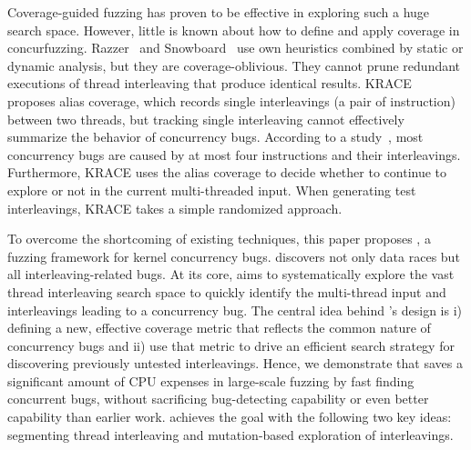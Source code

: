 

Coverage-guided fuzzing has proven to be effective in exploring such a huge search space.
However, little is known about how to define and apply coverage in concurfuzzing.
Razzer~\cite{razzer} and Snowboard~\cite{snowboard} use own heuristics
combined by static or dynamic analysis, but they are coverage-oblivious.
They cannot prune redundant executions of thread interleaving
that produce identical results. 
KRACE~\cite{krace} proposes alias coverage, which records 
single interleavings (a pair of instruction) between two threads, but tracking 
single interleaving cannot effectively summarize the behavior 
of concurrency bugs. According to a study~\cite{learningfrommistakes}, 
most concurrency bugs are caused by at most four instructions and their
interleavings. Furthermore, KRACE uses 
the alias coverage to decide whether to continue to explore or not 
in the current multi-threaded input. When generating test interleavings,
KRACE takes a simple randomized approach.

To overcome the shortcoming of existing techniques, this paper proposes
\sys, a fuzzing framework for kernel concurrency bugs. 
\sys discovers not only data races but 
all interleaving-related bugs. 
At its core, \sys aims to systematically explore the vast thread
interleaving search space to quickly identify the multi-thread input and 
interleavings leading to a concurrency bug. The central idea behind \sys's design
is i) defining a new, effective coverage metric that reflects the 
common nature of concurrency bugs and ii) use that metric to drive 
an efficient search strategy for discovering previously untested interleavings.
Hence, we demonstrate that \sys saves a significant amount of CPU expenses 
in large-scale fuzzing by fast finding concurrent bugs, 
without sacrificing bug-detecting capability or even better 
capability than earlier work.
\sys achieves the goal with the following two key ideas:
segmenting thread interleaving and mutation-based exploration of interleavings.

